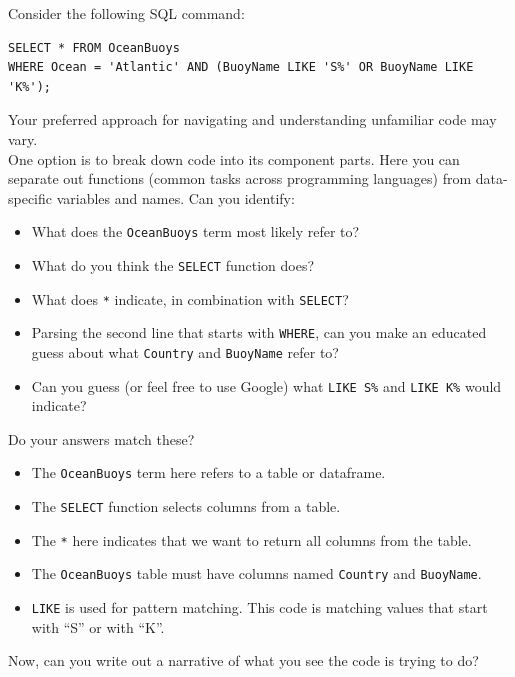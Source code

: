\documentclass[
]{book}
\providecommand{\tightlist}{%
  \setlength{\itemsep}{0pt}\setlength{\parskip}{0pt}}
\begin{document}
Consider the following SQL command:

\begin{verbatim}
SELECT * FROM OceanBuoys
WHERE Ocean = 'Atlantic' AND (BuoyName LIKE 'S%' OR BuoyName LIKE 'K%');
\end{verbatim}

Your preferred approach for navigating and understanding unfamiliar code may vary.\\

One option is to break down code into its component parts. Here you can separate out functions (common tasks across programming languages) from data-specific variables and names. Can you identify:

\begin{itemize}
\tightlist
\item
  What does the \texttt{OceanBuoys} term most likely refer to?
\item
  What do you think the \texttt{SELECT} function does?
\item
  What does \texttt{*} indicate, in combination with \texttt{SELECT}?
\item
  Parsing the second line that starts with \texttt{WHERE}, can you make an educated guess about what \texttt{Country} and \texttt{BuoyName} refer to?
\item
  Can you guess (or feel free to use Google) what \texttt{LIKE\ \textquotesingle{}S\%\textquotesingle{}} and \texttt{LIKE\ \textquotesingle{}K\%\textquotesingle{}} would indicate?
\end{itemize}

Do your answers match these?

\begin{itemize}
\tightlist
\item
  The \texttt{OceanBuoys} term here refers to a table or dataframe.
\item
  The \texttt{SELECT} function selects columns from a table.
\item
  The \texttt{*} here indicates that we want to return all columns from the table.
\item
  The \texttt{OceanBuoys} table must have columns named \texttt{Country} and \texttt{BuoyName}.
\item
  \texttt{LIKE} is used for pattern matching. This code is matching values that start with ``S'' or with ``K''.
\end{itemize}

\hfill\break

Now, can you write out a narrative of what you see the code is trying to do?\\
\end{document}
